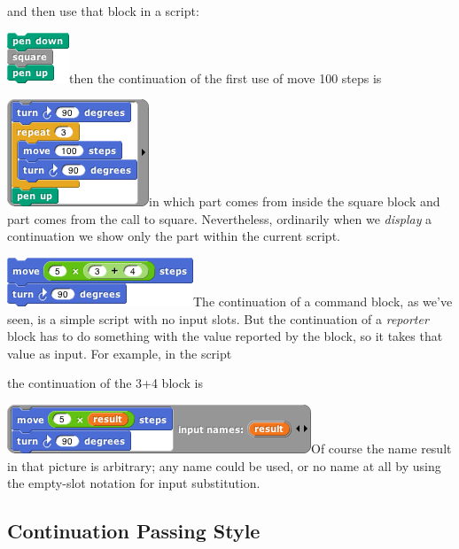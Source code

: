 and then use that block in a script:

\includegraphics[width=0.72917in,height=0.59375in]{media/image880.png}then
the continuation of the first use of move 100 steps is

\includegraphics[width=1.66667in,height=1.26042in]{media/image881.png}in
which part comes from inside the square block and part comes from the
call to square. Nevertheless, ordinarily when we \emph{display} a
continuation we show only the part within the current script.

\includegraphics[width=2.1875in,height=0.57292in]{media/image882.png}The
continuation of a command block, as we've seen, is a simple script with
no input slots. But the continuation of a \emph{reporter} block has to
do something with the value reported by the block, so it takes that
value as input. For example, in the script

the continuation of the 3+4 block is

\includegraphics[width=3.57292in,height=0.57292in]{media/image883.png}Of
course the name result in that picture is arbitrary; any name could be
used, or no name at all by using the empty-slot notation for input
substitution.

\subsection{Continuation Passing
Style}\label{continuation-passing-style}

